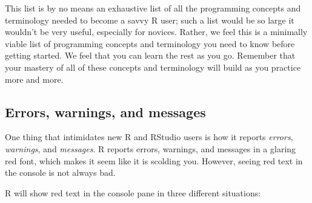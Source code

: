 \documentclass[]{book}
\begin{document}
This list is by no means an exhaustive list of all the programming concepts and terminology needed to become a savvy R user; such a list would be so large it wouldn't be very useful, especially for novices. Rather, we feel this is a minimally viable list of programming concepts and terminology you need to know before getting started. We feel that you can learn the rest as you go. Remember that your mastery of all of these concepts and terminology will build as you practice more and more.

\hypertarget{messages}{%
\subsection{Errors, warnings, and messages}\label{messages}}

One thing that intimidates new R and RStudio users is how it reports \emph{errors}, \emph{warnings}, and \emph{messages}. R reports errors, warnings, and messages in a glaring red font, which makes it seem like it is scolding you. However, seeing red text in the console is not always bad.

R will show red text in the console pane in three different situations:
\end{document}

